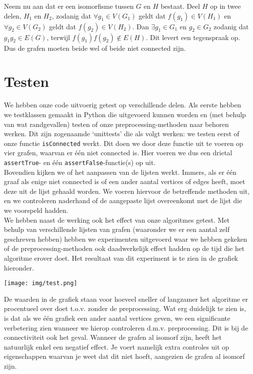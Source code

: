 \documentclass{article}
\begin{document}
\begin{algorithm}[H]
\begin{enumerate}
\vspace{5mm}
Neem nu aan dat er een isomorfisme tussen $G$ en $H$ bestaat. Deel $H$ op in twee delen, $H_1$ en $H_2$, zodanig dat $\forall g_1\in V(G_1)$ geldt dat $f(g_1)\in V(H_1)$ en $\forall g_2\in V(G_2)$ geldt dat $f(g_2)\in V(H_2)$.
Dan $\exists g_1\in G_1$ en $g_2\in G_2$ zodanig dat $g_1g_2\in E(G)$, terwijl $f(g_1)f(g_2)\notin E(H)$. Dit levert een tegenspraak op.\\
Dus de grafen moeten beide wel of beide niet connected zijn.
\end{enumerate}

\pagebreak


\section{Testen}
We hebben onze code uitvoerig getest op verschillende delen. Als eerste hebben we testklassen gemaakt in Python die uitgevoerd kunnen worden en (met behulp van wat randgevallen) testen of onze preprocessing-methoden naar behoren werken. Dit zijn zogenaamde `unittests' die als volgt werken: we testen eerst of onze functie \texttt{isConnected} werkt. Dit doen we door deze functie uit te voeren op vier grafen, waarvan er \'e\'en niet connected is. Hier voeren we dus een drietal \texttt{assertTrue}- en \'e\'en \texttt{assertFalse}-functie(s) op uit.\\
Bovendien kijken we of het aanpassen van de lijsten werkt. Immers, als er \'e\'en graaf als enige niet connected is of een ander aantal vertices of edges heeft, moet deze uit de lijst gehaald worden. We voeren hiervoor de betreffende methoden uit, en we controleren naderhand of de aangepaste lijst overeenkomt met de lijst die we voorspeld hadden.\\

We hebben naast de werking ook het effect van onze algoritmes getest. Met behulp van verschillende lijsten van grafen (waaronder we er een aantal zelf geschreven hebben) hebben we experimenten uitgevoerd waar we hebben gekeken of de preprocessing-methoden ook daadwerkelijk effect hadden op de tijd die het algoritme erover doet. Het resultaat van dit experiment is te zien in de grafiek hieronder.
\begin{center}
\texttt{[image: img/test.png]}
\end{center}
De waarden in de grafiek staan voor hoeveel sneller of langzamer het algoritme er procentueel over doet t.o.v. zonder de preprocessing. Wat erg duidelijk te zien is, is dat als we \'e\'en grafiek een ander aantal vertices geven, we een significante verbetering zien wanneer we hierop controleren d.m.v. preprocessing. Dit is bij de connectiviteit ook het geval. Wanneer de grafen al isomorf zijn, heeft het natuurlijk enkel een negatief effect. Je voert namelijk extra controles uit op eigenschappen waarvan je weet dat dit niet hoeft, aangezien de grafen al isomorf zijn.
\pagebreak


\end{algorithm}
\end{document}
